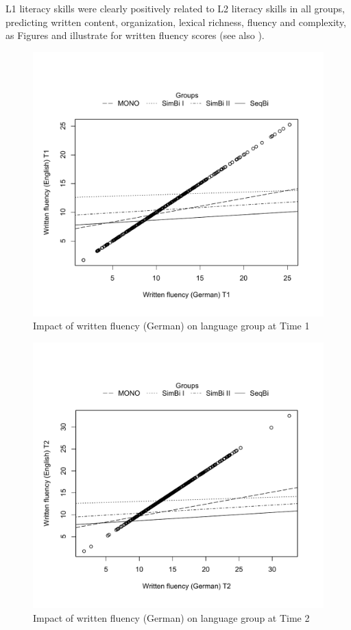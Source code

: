 \documentclass[output=paper,modfonts,nonflat,newtxmath]{langsci/langscibook}
\begin{document}
L1 literacy skills were clearly positively related to L2 literacy skills in all groups, predicting written content, organization, lexical richness, fluency and complexity, as Figures  and  illustrate for written fluency scores (see also \citealt{Pfenninger2014}).


\begin{figure}%
\includegraphics[height=.45\textheight]{figures/PfenningerFigure7.pdf}
\caption{\label{fig:pfenninger:7}Impact of written fluency (German) on language group at Time 1}
\end{figure}

\begin{figure}%
\includegraphics[height=.45\textheight]{figures/PfenningerFigure8.pdf}
\caption{\label{fig:pfenninger:8} Impact of written fluency (German) on language group at Time 2}
\end{figure}
\end{document}
